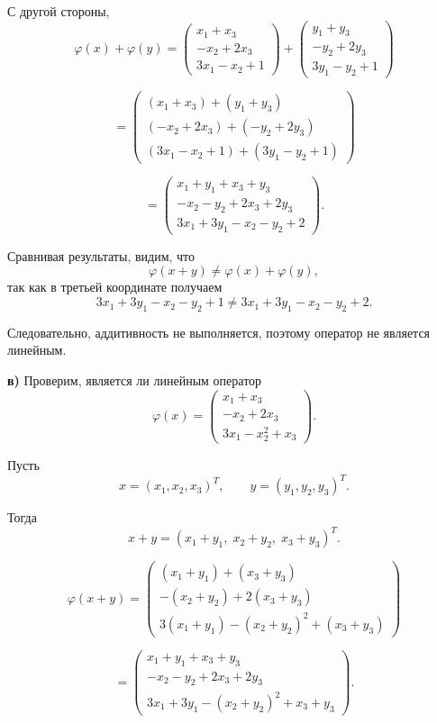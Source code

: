 С другой стороны,
\[
\varphi(x)+\varphi(y)=
\begin{pmatrix}
x_1+x_3\\
-x_2+2x_3\\
3x_1-x_2+1
\end{pmatrix}
+
\begin{pmatrix}
y_1+y_3\\
-y_2+2y_3\\
3y_1-y_2+1
\end{pmatrix}
\]

\[
=
\begin{pmatrix}
(x_1+x_3)+(y_1+y_3)\\
(-x_2+2x_3)+(-y_2+2y_3)\\
(3x_1-x_2+1)+(3y_1-y_2+1)
\end{pmatrix}
\]

\[
=
\begin{pmatrix}
x_1+y_1+x_3+y_3\\
-x_2-y_2+2x_3+2y_3\\
3x_1+3y_1-x_2-y_2+2
\end{pmatrix}.
\]

Сравнивая результаты, видим, что
\[
\varphi(x+y)\neq \varphi(x)+\varphi(y),
\]
так как в третьей координате получаем
\[
3x_1+3y_1-x_2-y_2+1
\neq
3x_1+3y_1-x_2-y_2+2.
\]

Следовательно, аддитивность не выполняется, поэтому оператор не является линейным.

\bigskip

\textbf{в)} Проверим, является ли линейным оператор
\[
\varphi(x)=
\begin{pmatrix}
x_1+x_3\\
-x_2+2x_3\\
3x_1-x_2^2+x_3
\end{pmatrix}.
\]

Пусть
\[
x=(x_1,x_2,x_3)^T,\qquad y=(y_1,y_2,y_3)^T.
\]

Тогда
\[
x+y=(x_1+y_1,\;x_2+y_2,\;x_3+y_3)^T.
\]

\[
\varphi(x+y)=
\begin{pmatrix}
(x_1+y_1)+(x_3+y_3)\\
-(x_2+y_2)+2(x_3+y_3)\\
3(x_1+y_1)-(x_2+y_2)^2+(x_3+y_3)
\end{pmatrix}
\]

\[
=
\begin{pmatrix}
x_1+y_1+x_3+y_3\\
-x_2-y_2+2x_3+2y_3\\
3x_1+3y_1-(x_2+y_2)^2+x_3+y_3
\end{pmatrix}.
\]

